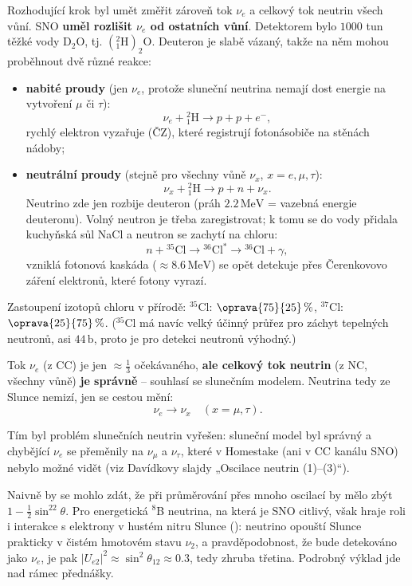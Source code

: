 Rozhodující krok byl umět změřit zároveň tok \(\nu_e\) a celkový tok neutrin všech vůní. SNO \textbf{uměl rozlišit \(\nu_e\) od ostatních vůní}. Detektorem bylo \(1000\) tun těžké vody \(\mathrm{D_2O}\), tj. \(\left({}^2_1\mathrm{H}\right)_2\mathrm{O}\). Deuteron je slabě vázaný, takže na něm mohou proběhnout dvě různé reakce:
\begin{itemize}[nosep]
  \item \textbf{nabité proudy} (jen \(\nu_e\), protože sluneční neutrina nemají dost energie na vytvoření \(\mu\) či \(\tau\)):
  \[
    \nu_e+{}^2_1\mathrm{H}\to p+p+e^-,
  \]
  rychlý elektron vyzařuje  (ČZ), které registrují fotonásobiče na stěnách nádoby;
  \item \textbf{neutrální proudy} (stejně pro všechny vůně \(\nu_x\), \(x=e,\mu,\tau\)):
  \[
    \nu_x+{}^2_1\mathrm{H}\to p+n+\nu_x .
  \]
  Neutrino zde jen rozbije deuteron (práh \(2.2\,\mathrm{MeV}\) = vazebná energie deuteronu). Volný neutron je třeba zaregistrovat; k tomu se do vody přidala kuchyňská sůl NaCl a neutron se zachytí na chloru:
  \[
    n+{}^{35}\mathrm{Cl}\to{}^{36}\mathrm{Cl}^*\to{}^{36}\mathrm{Cl}+\gamma ,
  \]
  vzniklá fotonová kaskáda (\(\approx8.6\,\mathrm{MeV}\)) se opět detekuje přes Čerenkovovo záření elektronů, které fotony vyrazí.
\end{itemize}
Zastoupení izotopů chloru v přírodě: \(^{35}\)Cl: \(\oprava{75}{25}\,\%\), \(^{37}\)Cl: \(\oprava{25}{75}\,\%\). (\(^{35}\)Cl má navíc velký účinný průřez pro záchyt tepelných neutronů, asi \(44\,\mathrm{b}\), proto je pro detekci neutronů výhodný.)

\begin{veta}
Tok \(\nu_e\) (z CC) je jen \(\approx\frac13\) očekávaného, \textbf{ale celkový tok neutrin} (z NC, všechny vůně) \textbf{je správně} -- souhlasí se slunečním modelem. Neutrina tedy ze Slunce nemizí, jen se cestou mění:
\[
  \nu_e\to\nu_x\quad(x=\mu,\tau).
\]
\end{veta}
Tím byl problém slunečních neutrin vyřešen: sluneční model byl správný a chybějící \(\nu_e\) se přeměnily na \(\nu_\mu\) a \(\nu_\tau\), které v Homestake (ani v CC kanálu SNO) nebylo možné vidět (viz Davídkovy slajdy „Oscilace neutrin (1)--(3)“).

\begin{vysvetleni}
Naivně by se mohlo zdát, že při průměrování přes mnoho oscilací by mělo zbýt \(1-\frac12\sin^22\theta\). Pro energetická \(^8\)B neutrina, na která je SNO citlivý, však hraje roli i interakce s elektrony v hustém nitru Slunce (): neutrino opouští Slunce prakticky v čistém hmotovém stavu \(\nu_2\), a pravděpodobnost, že bude detekováno jako \(\nu_e\), je pak \(|U_{e2}|^2\approx\sin^2\theta_{12}\approx0.3\), tedy zhruba třetina. Podrobný výklad jde nad rámec přednášky.
\end{vysvetleni}

